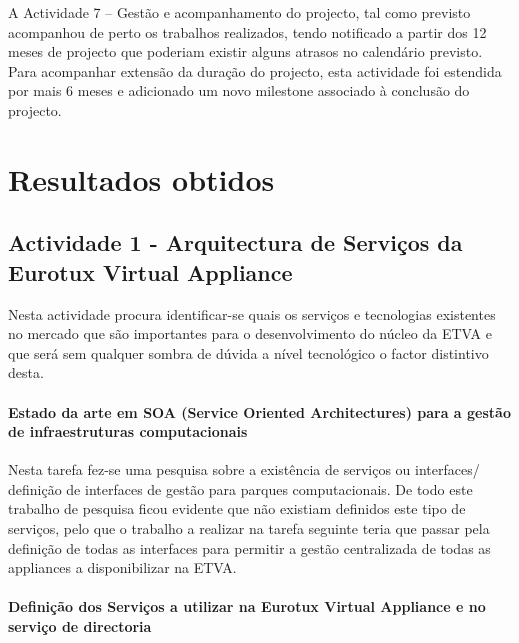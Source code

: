 \documentclass[a4paper,12pt,portugues]{article}
\begin{document}
A Actividade 7 – Gestão e acompanhamento do projecto, tal como previsto
acompanhou de perto os trabalhos realizados, tendo notificado a partir dos 12
meses de projecto que poderiam existir alguns atrasos no calendário previsto.
Para acompanhar extensão da duração do projecto, esta actividade foi estendida
por mais 6 meses e adicionado um novo milestone associado à conclusão do
projecto.


\section{Resultados obtidos} %
\label{sec:resultados_obtidos}



\subsection{Actividade 1 - Arquitectura de Serviços da Eurotux Virtual Appliance} %

Nesta actividade procura identificar-se quais os serviços e tecnologias
existentes no mercado que são importantes para o desenvolvimento do núcleo da
ETVA e que será sem qualquer sombra de dúvida a nível tecnológico o factor
distintivo desta.


\paragraph{Estado da arte em SOA (Service Oriented Architectures) para a gestão de infraestruturas computacionais} %

Nesta tarefa fez-se uma pesquisa sobre a existência de serviços ou interfaces/
definição de interfaces de gestão para parques computacionais. De todo este
trabalho de pesquisa ficou evidente que não existiam definidos este tipo de
serviços, pelo que o trabalho a realizar na tarefa seguinte teria que passar
pela definição de todas as interfaces para permitir a gestão centralizada de
todas as appliances a disponibilizar na ETVA.

\paragraph{Definição dos Serviços a utilizar na Eurotux Virtual Appliance e no serviço de directoria} %
\end{document}

